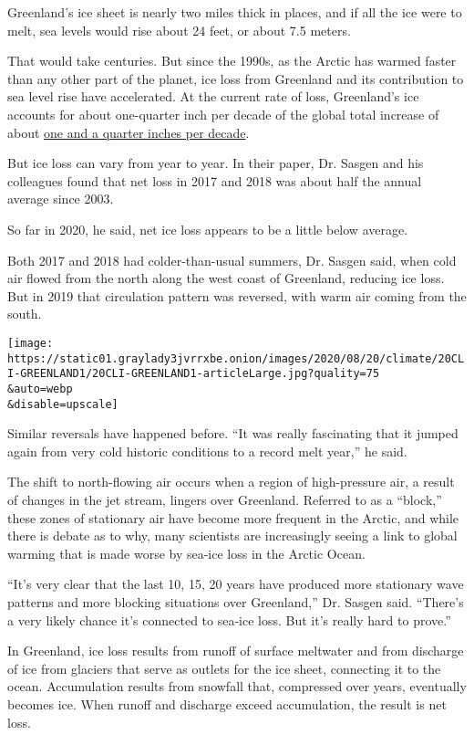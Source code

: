Greenland's ice sheet is nearly two miles thick in places, and if all
the ice were to melt, sea levels would rise about 24 feet, or about 7.5
meters.

That would take centuries. But since the 1990s, as the Arctic has warmed
faster than any other part of the planet, ice loss from Greenland and
its contribution to sea level rise have accelerated. At the current rate
of loss, Greenland's ice accounts for about one-quarter inch per decade
of the global total increase of about
\href{https://climate.nasa.gov/vital-signs/sea-level/}{one and a quarter
inches per decade}.

But ice loss can vary from year to year. In their paper, Dr. Sasgen and
his colleagues found that net loss in 2017 and 2018 was about half the
annual average since 2003.

So far in 2020, he said, net ice loss appears to be a little below
average.

Both 2017 and 2018 had colder-than-usual summers, Dr. Sasgen said, when
cold air flowed from the north along the west coast of Greenland,
reducing ice loss. But in 2019 that circulation pattern was reversed,
with warm air coming from the south.

\texttt{[image: https://static01.graylady3jvrrxbe.onion/images/2020/08/20/climate/20CLI-GREENLAND1/20CLI-GREENLAND1-articleLarge.jpg?quality=75\\\&auto=webp\\\&disable=upscale]}

Similar reversals have happened before. ``It was really fascinating that
it jumped again from very cold historic conditions to a record melt
year,'' he said.

The shift to north-flowing air occurs when a region of high-pressure
air, a result of changes in the jet stream, lingers over Greenland.
Referred to as a ``block,'' these zones of stationary air have become
more frequent in the Arctic, and while there is debate as to why, many
scientists are increasingly seeing a link to global warming that is made
worse by sea-ice loss in the Arctic Ocean.

``It's very clear that the last 10, 15, 20 years have produced more
stationary wave patterns and more blocking situations over Greenland,''
Dr. Sasgen said. ``There's a very likely chance it's connected to
sea-ice loss. But it's really hard to prove.''

In Greenland, ice loss results from runoff of surface meltwater and from
discharge of ice from glaciers that serve as outlets for the ice sheet,
connecting it to the ocean. Accumulation results from snowfall that,
compressed over years, eventually becomes ice. When runoff and discharge
exceed accumulation, the result is net loss.

